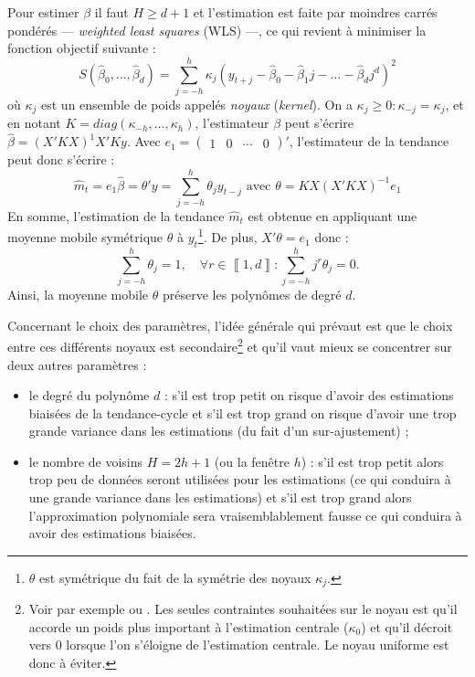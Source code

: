 \documentclass[
  12pt,
  a4paper,french]{article}
\newcommand\1{\mathds{1}}
\begin{document}
Pour estimer \(\beta\) il faut \(H\geq d+1\) et l'estimation est faite par moindres carrés pondérés --- \emph{weighted least squares} (WLS) ---, ce qui revient à minimiser la fonction objectif suivante :
\[
S(\hat{\beta}_{0},\dots,\hat{\beta}_{d})=\sum_{j=-h}^{h}\kappa_{j}(y_{t+j}-\hat{\beta}_{0}-\hat{\beta}_{1}j-\dots-\hat{\beta}_{d}j^{d})^{2}
\]
où \(\kappa_j\) est un ensemble de poids appelés \emph{noyaux} (\emph{kernel}).
On a \(\kappa_j\geq 0:\kappa_{-j}=\kappa_j\), et en notant \(K=diag(\kappa_{-h},\dots,\kappa_{h})\), l'estimateur \(\beta\) peut s'écrire \(\hat{\beta}=(X'KX)^{1}X'Ky\).
Avec \(e_{1}=\begin{pmatrix}1&0&\cdots&0\end{pmatrix}'\), l'estimateur de la tendance peut donc s'écrire :
\[
\hat{m}_{t}=e_{1}\hat{\beta}=\theta'y=\sum_{j=-h}^{h}\theta_{j}y_{t-j}\text{ avec }\theta=KX(X'KX)^{-1}e_{1}
\]
En somme, l'estimation de la tendance \(\hat{m}_{t}\) est obtenue en appliquant une moyenne mobile symétrique \(\theta\) à \(y_t\)\footnote{
  \(\theta\) est symétrique du fait de la symétrie des noyaux \(\kappa_j\).}.
De plus, \(X'\theta=e_{1}\) donc :
\[
\sum_{j=-h}^{h}\theta_{j}=1,\quad\forall r\in\left\llbracket 1,d\right\rrbracket :\sum_{j=-h}^{h}j^{r}\theta_{j}=0.
\]
Ainsi, la moyenne mobile \(\theta\) préserve les polynômes de degré \(d\).

Concernant le choix des paramètres, l'idée générale qui prévaut est que le choix entre ces différents noyaux est secondaire\footnote{
  Voir par exemple \textcite{cleveland1996smoothing} ou \textcite{Loader1999}.
  Les seules contraintes souhaitées sur le noyau est qu'il accorde un poids plus important à l'estimation centrale (\(\kappa_0\)) et qu'il décroit vers 0 lorsque l'on s'éloigne de l'estimation centrale.
  Le noyau uniforme est donc à éviter.} et qu'il vaut mieux se concentrer sur deux autres paramètres :

\begin{itemize}
\item
  le degré du polynôme \(d\) : s'il est trop petit on risque d'avoir des estimations biaisées de la tendance-cycle et s'il est trop grand on risque d'avoir une trop grande variance dans les estimations (du fait d'un sur-ajustement) ;
\item
  le nombre de voisins \(H=2h+1\) (ou la fenêtre \(h\)) : s'il est trop petit alors trop peu de données seront utilisées pour les estimations (ce qui conduira à une grande variance dans les estimations) et s'il est trop grand alors l'approximation polynomiale sera vraisemblablement fausse ce qui conduira à avoir des estimations biaisées.
\end{itemize}
\end{document}
